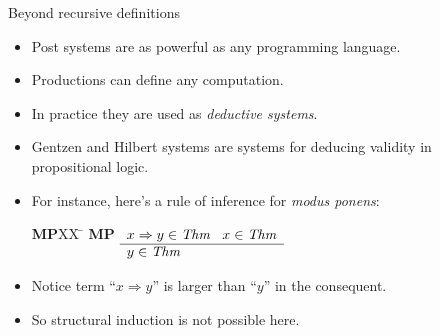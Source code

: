 \begin{wideslide}[bm=,toc=]{Beyond recursive definitions}
\begin{itemize}
\item Post systems are as powerful as any programming language.
\item Productions can define any computation.
\item In practice they are used as {\em deductive systems\/}.
\item Gentzen and Hilbert systems are systems for deducing validity in propositional logic.
\item For instance, here's a rule of inference for {\em modus ponens\/}:
\vspace{-1em}
\begin{tabbing}
{\bf MP}XX \=  \kill
{\bf MP} \>
        \(\begin{array}[t]{l}
        x\Rightarrow y \in\mbox{\it Thm\/}\;\;\;x\in\mbox{\it Thm\/} \\
        \hline
        y\in\mbox{\it Thm\/}
        \end{array}\)
\end{tabbing}
\item Notice term ``$x\Rightarrow y$'' is larger than ``$y$'' in the consequent.
\item So structural induction is not possible here.
\end{itemize}
\end{wideslide}
